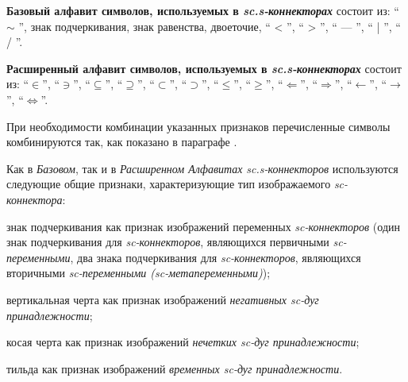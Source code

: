 \textbf{Базовый алфавит символов, используемых в \textit{sc.s-коннекторах}\scnsupergroupsign} состоит из: `` $\sim$ ''{}, знак подчеркивания, знак равенства, двоеточие, `` < ''{}, `` > ''{}, `` --- ''{}, `` | ''{}, `` / ''{}.
	
\textbf{Расширенный алфавит символов, используемых в \textit{sc.s-коннекторах}\scnsupergroupsign} состоит из:
	``$\in$''{}, 
	``$\ni$''{}, ``$\subseteq$''{}, ``$\supseteq$''{},   ``$\subset$''{}, ``$\supset$''{}, ``$\leq$''{},  ``$\geq$''{}, ``$\Leftarrow$''{}, ``$\Rightarrow$''{}, ``$\leftarrow$''{}, ``$\rightarrow$''{}, 
	``$\Leftrightarrow$''{}.


При необходимости комбинации указанных признаков перечисленные символы комбинируются так, как показано в параграфе .

Как в \textit{Базовом}, так и в \textit{Расширенном Алфавитах} \textit{sc.s-коннекторов} используются следующие общие признаки, характеризующие тип изображаемого \textit{sc-коннектора}:
\begin{textitemize}
	\item знак подчеркивания как признак изображений переменных \textit{sc-коннекторов} (один знак подчеркивания для \textit{sc-коннекторов}, являющихся первичными \textit{sc-переменными}, два знака подчеркивания для \textit{sc-коннекторов}, являющихся вторичными \textit{sc-переменными (sc-метапеременными)});
	\item вертикальная черта \scnqqi{ $ | $ } как признак изображений \textit{негативных sc-дуг принадлежности};
	\item косая черта \scnqqi{ $ / $ } как признак изображений \textit{нечетких sc-дуг принадлежности};
	\item тильда \scnqqi{ $ \sim $ } как признак изображений \textit{временных sc-дуг принадлежности}.
\end{textitemize}

